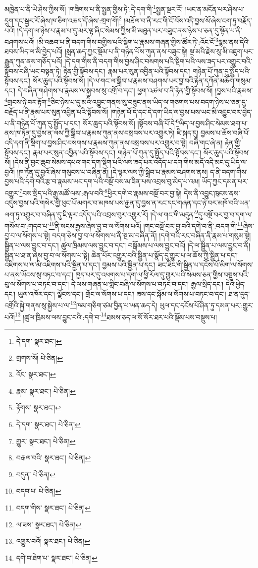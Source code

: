 མཁྱེན་པ་ནི་ཡེ་ཤེས་ཀྱིས་སོ། །གཟིགས་པ་ནི་སྤྱན་གྱིས་ཏེ་:དེ་དག་གི་\footnote{དེ་དག་  སྣར་ཐང་། }སྤྱན་སྔར་རོ། །ཡང་ན་མངོན་པར་ཤེས་པ་དྲུག་དང་སྦྱར་རོ་ཞེས་ཁ་ཅིག་འཆད་དོ་ཞེས་:གྲག་གོ།\footnote{གྲགས་སོ།  པེ་ཅིན། } །མཐོལ་བ་ནི་རང་གི་ངོ་བོས་འདི་བྱས་སོ་ཞེས་ངག་ཏུ་བརྗོད་པའོ། །དེ་དག་ལ་ཉེས་པ་རྣམ་པ་དུ་མར་ལྟ་ཞིང་སེམས་ཀྱིས་མི་མཐུན་པར་བཟུང་ནས་ཉེས་པ་ཅན་དུ་སྟོན་པ་ནི་བཤགས་པའོ། །མི་འཆབ་པ་ནི་བདག་གིས་བགྱིས་པའི་སྡིག་པ་རྣམས་གཞན་གྱིས་ཚོར་ཏེ་:འོང་ངོ་\footnote{འོང་  སྣར་ཐང་། }སྙམ་ནས་དེའི་ཐབས་ཡིད་ལ་མི་བྱེད་པའོ། །སླན་ཆད་ཀྱང་སྡོམ་པ་ནི་གཉེན་པོས་ཀུན་ནས་བཟུང་སྟེ། སྔ་མའི་རྗེས་སུ་མི་འཇུག་པར་རྒྱུན་ཀུན་ནས་གཅོད་པའོ། །དེ་དག་གིས་ནི་བདག་གིས་བྱས་ཤིང་བསགས་པའི་སྡིག་པའི་ལས་ཟད་པར་འགྱུར་བའི་སྟོབས་བཞི་ཡང་བསྟན་ཏེ། རྟེན་གྱི་སྟོབས་དང་། རྣམ་པར་སུན་འབྱིན་པའི་སྟོབས་དང་། གཉེན་པོ་ཀུན་དུ་སྤྱོད་པའི་སྟོབས་དང་། སོར་ཆུད་པའི་སྟོབས་སོ། །དེ་ལ་གང་ལ་སྒྲིབ་པ་རྣམས་བཤགས་པར་བྱ་བའི་རྟེན་དཀོན་མཆོག་གསུམ་དང་། དེ་བཞིན་གཤེགས་པ་རྣམས་ལ་སྐྱབས་སུ་འགྲོ་བ་དང་། ཕྱག་འཚལ་བ་ནི་རྟེན་གྱི་སྟོབས་སོ། །བྱས་པའི་རྣམས་\footnote{རྣམ་  སྣར་ཐང་།  པེ་ཅིན། }གྲངས་ཉེ་བར་རྟོག་\footnote{རྟོགས་  སྣར་ཐང་། }ཅིང་ཉེས་པ་དུ་མའི་འབྱུང་གནས་སུ་བཟུང་ནས་ཡིད་ལ་གཅགས་པས་བདག་ཉེས་པ་ཅན་དུ་བརྗོད་པ་ནི་རྣམ་པར་སུན་འབྱིན་པའི་སྟོབས་སོ། །གཉེན་པོ་དེ་དང་དེ་དག་ཡིད་ལ་བྱས་པས་ཡང་མི་འབྱུང་བར་བྱེད་པ་ནི་གཉེན་པོ་ཀུན་དུ་སྤྱོད་པ་དང་། སོར་ཆུད་པའི་སྟོབས་སོ། །སྟོབས་བཞི་པོ་དེ་\footnote{དེ་དག་  སྣར་ཐང་།  པེ་ཅིན། }ཡིད་ལ་བྱས་ཤིང་སེམས་ཐག་པ་ནས་ཁ་ཏོན་དུ་བྱས་ན་ལས་ཀྱི་སྒྲིབ་པ་རྣམས་ཀུན་ནས་བསྲབས་པར་འགྱུར་ཏེ། ཇི་སྐད་དུ། བྱམས་པ་ཆོས་བཞི་པོ་འདི་དག་ནི་སྡིག་པ་བྱས་ཤིང་བསགས་པ་རྣམས་ཀུན་ནས་བསྲབས་པར་འགྱུར་བ་སྟེ། བཞི་གང་ཞེ་ན། རྟེན་གྱི་སྟོབས་དང་། རྣམ་པར་སུན་འབྱིན་པའི་སྟོབས་དང་། གཉེན་པོ་ཀུན་དུ་སྤྱོད་པའི་སྟོབས་དང་། སོར་ཆུད་པའི་སྟོབས་སོ། །དེས་ནི་བྱང་ཆུབ་སེམས་དཔའ་གང་དག་སྡིག་པའི་ལས་ཟད་པར་འདོད་པ་དག་གིས་མདོ་འདི་མང་དུ་ཡིད་ལ་བྱའོ། །ཁ་ཏོན་དུ་བྱའོ་ཞེས་གསུངས་པ་བཞིན་ནོ། །དེ་ལྟར་ལས་ཀྱི་སྒྲིབ་པ་རྣམས་བཤགས་ནས། ད་ནི་བདག་གིས་བྱས་པའི་དགེ་བའི་རྩ་བ་རྣམས་ཡང་དག་པའི་བསྔོ་བས་མ་ཟིན་པས་འབྲས་བུ་མེད་པ་འམ། ཡོད་ཀྱང་དམན་པར་འགྱུར་\footnote{གྱུར་  སྣར་ཐང་།  པེ་ཅིན། }བས་སྲིད་པའི་རྒྱ་མཚོ་ལས་:རྒལ་བའི་\footnote{བརྒལ་བའི་  སྣར་ཐང་།  པེ་ཅིན། }ཕྱིར་དགེ་བ་རྣམས་བསྔོ་བར་བྱ་སྟེ། དེས་ནི་འབྱུང་ཁུངས་ནས་འདུས་བྱས་པའི་གསེར་གྱི་ཕུང་པོ་མགར་བ་མཁས་པས་རྒྱན་དུ་བྱས་ན་རང་དང་གཞན་དང་ཉེ་བར་མཁོ་བའི་ཡན་ལག་ཏུ་འགྱུར་བ་བཞིན་དུ་ཇི་ལྟར་འདོད་པའི་འབྲས་བུར་འགྱུར་རོ། །དེ་ལ་གང་གི་མདུན་\footnote{བདུན་  པེ་ཅིན། }དུ་བསྔོ་བར་བྱ་བ་དག་ལ་གསོལ་བ་:གདབ་པ་\footnote{བདབ་པ་  པེ་ཅིན། }ནི་སངས་རྒྱས་ཞེས་བྱ་བ་ལ་སོགས་པའོ། །གང་བསྔོ་བར་བྱ་བའི་དགེ་བ་ནི་:བདག་གི་\footnote{བདག་གིས་  སྣར་ཐང་།  པེ་ཅིན། }ཞེས་བྱ་བ་ལ་སོགས་པ་སྟེ། བདག་ཅེས་བྱ་བ་ལ་སོགས་པ་ནི་སྔ་མ་བཞིན་ནོ། །དགེ་བའི་རང་བཞིན་ནི་རྣམ་པ་གསུམ་སྟེ། སྦྱིན་པ་ལས་བྱུང་བ་དང་། ཚུལ་ཁྲིམས་ལས་བྱུང་བ་དང་། བསྒོམས་པ་ལས་བྱུང་བའོ། །དེ་ལ་སྦྱིན་པ་ལས་བྱུང་བ་ནི། སྦྱིན་པ་ཐ་ན་ཞེས་བྱ་བ་ལ་སོགས་པ་སྟེ། ཆེན་པོར་འགྱུར་བའི་སྦྱིན་པ་སྣོད་དུ་གྱུར་པ་ལ་ཆོས་ཀྱི་སྦྱིན་པ་དང་། འཇིགས་པ་ལ་མི་འཇིགས་པའི་སྦྱིན་པ་དང་། བྱམས་པའི་སྦྱིན་པ་དང་། ཟང་ཟིང་གི་སྦྱིན་པ་དངོས་པོ་མིག་ལ་སོགས་པ་ནས་ཡོངས་སུ་བཏང་བ་དང་། ཁྱད་པར་དུ་འཕགས་པ་དག་ལ་ཕྱི་རོལ་དུ་གྱུར་པའི་སེམས་ཅན་གྱིས་བསྡུས་པའི་བུ་ལ་སོགས་པ་བཏང་བ་དང་། དེ་ལས་གཞན་པ་གླིང་བཞི་ལ་སོགས་པ་བཏང་བ་དང་། རྒྱལ་སྲིད་དང་། དེའི་ཕྱེད་དང་། ཡུལ་འཁོར་དང་། ལྗོངས་དང་། གྲོང་ལ་སོགས་པ་དང་། ཟས་དང་སྐོམ་ལ་སོགས་པ་བཏང་བ་དང་། ཐ་ན་དུད་འགྲོའི་སྐྱེ་གནས་སུ་སྐྱེས་པ་ལ་\footnote{ལ་ཟས་  སྣར་ཐང་།  པེ་ཅིན། }ཁམ་གཅིག་ཙམ་བྱིན་པ་ཡན་ཆད་དེ། ཡུལ་དང་དངོས་པོ་ཤིན་ཏུ་དམན་པར་:གྱུར་པའོ།\footnote{འགྱུར་བའོ།  སྣར་ཐང་།  པེ་ཅིན། } །ཚུལ་ཁྲིམས་ལས་བྱུང་བའི་:དགེ་བ་\footnote{དགེ་བ་ཐེག་པ་  སྣར་ཐང་།  པེ་ཅིན། }ཐམས་ཅད་ལ་སོ་སོར་ཐར་པའི་སྡོམ་པས་བསྡུས་པ། 
